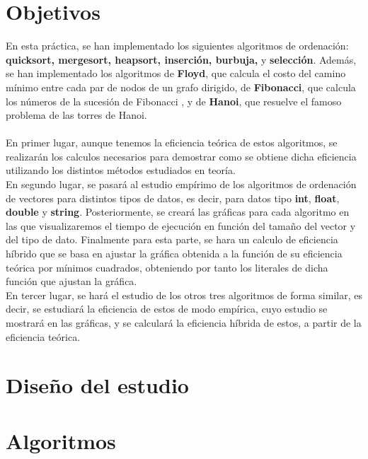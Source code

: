 \documentclass[11pt]{article}
\newcommand{\negrita}[1]{\textbf{#1}}
\begin{document}
\section{Objetivos}
    En esta práctica, se han implementado los siguientes algoritmos de ordenación: \negrita{quicksort, mergesort, heapsort, inserción, burbuja,}
    y \negrita{selección}. Además, se han implementado los algoritmos de \negrita{Floyd}, que calcula el costo del camino mínimo entre cada par de nodos 
    de un grafo dirigido, de \negrita{Fibonacci}, que calcula los números de la sucesión de Fibonacci , y de \negrita{Hanoi}, que resuelve el famoso 
    problema de las torres de Hanoi. \\ \\
    En primer lugar, aunque tenemos la eficiencia teórica de estos algoritmos, se realizarán los calculos necesarios para demostrar
    como se obtiene dicha eficiencia utilizando los distintos métodos estudiados en teoría. \\
    En segundo lugar, se pasará al estudio empírimo de los algoritmos de ordenación de vectores para distintos tipos de datos, es decir, 
    para datos tipo \negrita{int}, \negrita{float}, \negrita{double} y \negrita{string}. Posteriormente, se creará las gráficas para
    cada algoritmo en las que visualizaremos el tiempo de ejecución en función del tamaño del vector y del tipo de dato. Finalmente 
    para esta parte, se hara un calculo de eficiencia híbrido que se basa en ajustar la gráfica obtenida a la función de su eficiencia
    teórica por mínimos cuadrados, obteniendo por tanto los literales de dicha función que ajustan la gráfica.\\
    En tercer lugar, se hará el estudio de los otros tres algoritmos de forma similar, es decir, se estudiará la eficiencia
    de estos de modo empírica, cuyo estudio se mostrará en las gráficas, y se calculará la eficiencia híbrida de estos, a partir
    de la eficiencia teórica.\\ 

\section{Diseño del estudio}
    \newcommand{\mivar}{ordenación de vectores quicksort}
    
\section{Algoritmos}
\end{document}
